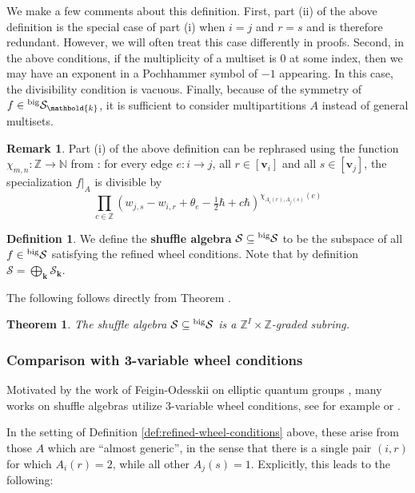 \documentclass[11pt,reqno]{amsart}
\renewcommand{\mathbf}{\mathbold}
\numberwithin{equation}{section}
\newtheorem{Theorem}[equation]{Theorem}
\theoremstyle{definition}
\newtheorem{Remark}[equation]{Remark}
\newtheorem{Definition}[equation]{Definition}
\newcommand{\cS}{\mathcal{S}}
\newcommand{\bk}{\mathbf{k}}
\newcommand{\bv}{\mathbf{v}}
\newcommand{\NN}{\mathbb{N}}
\newcommand{\ZZ}{\mathbb{Z}}
\newcommand{\leftexp}[2]{\vphantom{#2}^{#1} #2}
\renewcommand{\bv}{\mathbf{v}} %
\newcommand{\vertexset}{I}
\newcommand{\shu}{\cS}
\newcommand{\preshu}{\leftexp{\mathrm{big}}{\cS}}
\begin{document}
We make a few comments about this definition. First, part (ii) of the above definition is the special case of part (i) when $i = j$ and $r = s$ and is therefore redundant. However, we will often treat this case differently in proofs. Second, in the above conditions, if the multiplicity of a multiset is $0$ at some index, then we may have an exponent in a Pochhammer symbol of $-1$ appearing. In this case, the divisibility condition is vacuous. Finally, because of the symmetry of $f\in \preshu_\bk$, it is sufficient to consider multipartitions $A$ instead of general multisets.




\begin{Remark}
    Part (i) of the above definition can be rephrased using the function $\chi_{m,n} : \ZZ \rightarrow \NN$ from \cite[Definition 2.5]{JN26}:  for every edge $e : i \rightarrow j$, all $r \in [\bv_i]$ and all $s\in [\bv_j]$, the specialization $f|_A$ is divisible by
    $$
        \prod_{c \in \ZZ} (w_{j,s} - w_{i,r} + \theta_e - \tfrac{1}{2}\hbar + c \hbar)^{\chi_{A_i(r), A_j(s)}(c)}
    $$
\end{Remark}




\begin{Definition}
\label{def:shu}
We define the {\bf shuffle algebra} $\cS \subseteq \preshu$ to be the subspace of all $f \in \preshu$ satisfying the refined wheel conditions. Note that by definition $\shu = \bigoplus_{\bk} \shu_\bk$.
\end{Definition}

The following follows directly from Theorem .

\begin{Theorem}
The shuffle algebra $\shu \subseteq \preshu$ is a $\ZZ^\vertexset\times \ZZ$-graded subring.
\end{Theorem}


\subsubsection{Comparison with 3-variable wheel conditions}
Motivated by the  work of Feigin-Odesskii on elliptic quantum groups \cite{FO}, many works on shuffle algebras utilize 3-variable wheel conditions, see for example \cite[Definition 2.9]{Negut1} or \cite[(B.11)]{Frassek-Tsymbaliuk-2022}.  

In the setting of Definition \ref{def:refined-wheel-conditions} above, these arise from those $A$ which are ``almost generic'', in the sense that there is a single pair $(i,r)$ for which $A_i(r) = 2$, while all other $A_j(s) = 1$.  
Explicitly, this leads to the following:
\end{document}
